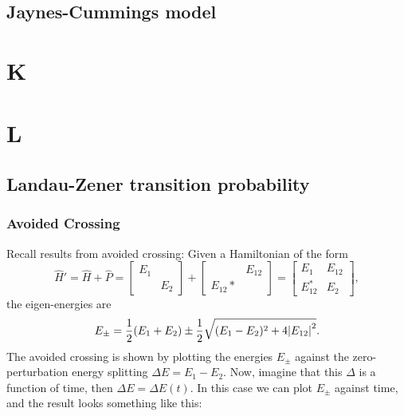 \documentclass{book}
\theoremstyle{definition}
\newcommand{\f}[2]{\frac{#1}{#2}}
\begin{document}
\section*{Jaynes-Cummings model}

\chapter*{K}
\chapter*{L}


\section*{Landau-Zener transition probability}


\subsection*{Avoided Crossing}

Recall results from avoided crossing: Given a Hamiltonian of the form 
\begin{equation*}
\widehat{H}' = \widehat{H} + \widehat{P} = \begin{bmatrix}
E_1 & \\ & E_2
\end{bmatrix} + \begin{bmatrix}
& E_{12} \\ E_{12}* &
\end{bmatrix} = \begin{bmatrix}
E_1 & E_{12} \\ E_{12}^* & E_2
\end{bmatrix},
\end{equation*}
the eigen-energies are
\begin{equation*}
E_\pm = \f{1}{2}(E_1 + E_2) \pm  \f{1}{2}\sqrt{(E_1 - E_2)^2 + 4\abs{E_{12}}^2}.
\end{equation*}
The avoided crossing is shown by plotting the energies $E_\pm$ against the zero-perturbation energy splitting $\Delta E = E_1 - E_2$. Now, imagine that this $\Delta$ is a function of time, then $\Delta E = \Delta E(t)$. In this case we can plot $E_\pm$ against time, and the result looks something like this:
\end{document}
